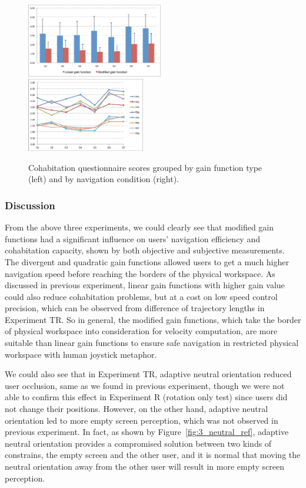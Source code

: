 \begin{figure}[tb]
  \centering
  \includegraphics[width=0.53\textwidth]{figures/ch3/qn_bar}
  \includegraphics[width=0.46\textwidth]{figures/ch3/qn_line}
  \caption{\label{fig:3_questionnaire}Cohabitation questionnaire scores grouped by gain function type (left) and by navigation condition (right).}
\end{figure}

\subsubsection{Discussion}
From the above three experiments, we could clearly see that modified gain functions had a significant influence on users' navigation efficiency and cohabitation capacity, shown by both objective and subjective measurements. The divergent and quadratic gain functions allowed users to get a much higher navigation speed before reaching the borders of the physical workspace. As discussed in previous experiment, linear gain functions with higher gain value could also reduce cohabitation problems, but at a cost on low speed control precision, which can be observed from difference of trajectory lengths in Experiment TR. So in general, the modified gain functions, which take the border of physical workspace into consideration for velocity computation, are more suitable than linear gain functions to ensure safe navigation in restricted physical workspace with human joystick metaphor.

We could also see that in Experiment TR, adaptive neutral orientation reduced user occlusion, same as we found in previous experiment, though we were not able to confirm this effect in Experiment R (rotation only test) since users did not change their positions. However, on the other hand, adaptive neutral orientation led to more empty screen perception, which was not observed in previous experiment. In fact, as shown by Figure~\ref{fig:3_neutral_ref}, adaptive neutral orientation provides a compromised solution between two kinds of constrains, the empty screen and the other user, and it is normal that moving the neutral orientation away from the other user will result in more empty screen perception.

